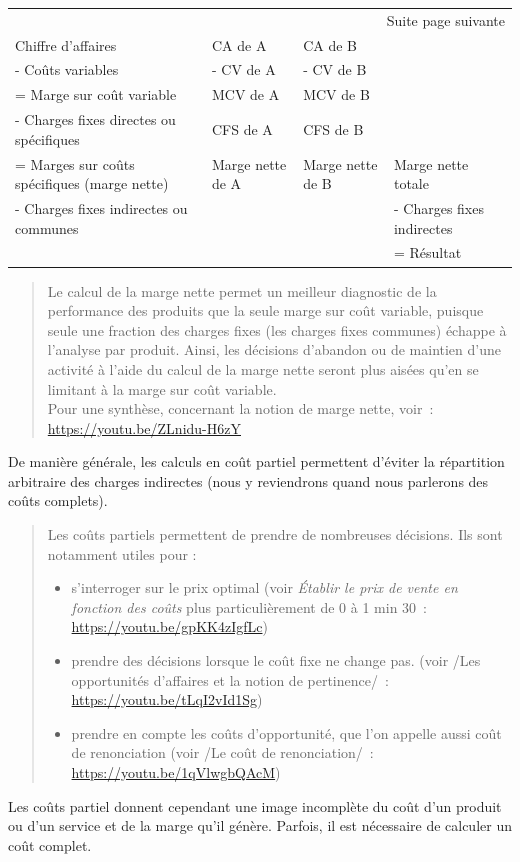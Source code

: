 \documentclass{tufte-handout}
\begin{document}
\begin{enumerate}
\begin{longtable}{llll}
\hline
\endhead
\hline\multicolumn{4}{r}{Suite page suivante} \\
\endfoot
\endlastfoot
\hline
Chiffre d'affaires & CA de A & CA de B & \\
- Coûts variables & - CV de A & - CV de B & \\
= Marge sur coût variable & MCV de A & MCV de B & \\
- Charges fixes directes ou spécifiques & CFS de A & CFS de B & \\
= Marges sur coûts spécifiques (marge nette) & Marge nette de A & Marge nette de B & Marge nette totale\\
- Charges fixes indirectes ou communes &  &  & - Charges fixes indirectes\\
 &  &  & = Résultat\\
\end{longtable}

\begin{quote}
Le calcul de la marge nette permet un meilleur diagnostic de la performance des produits que la seule marge sur coût variable, puisque seule une fraction des charges fixes (les charges fixes communes) échappe à l'analyse par produit. Ainsi, les décisions d'abandon ou de maintien d'une activité à l'aide du calcul de la marge nette seront plus aisées qu'en se limitant à la marge sur coût variable.\\
Pour une synthèse, concernant la notion de marge nette, voir : \url{https://youtu.be/ZLnidu-H6zY}\\
\end{quote}

De manière générale, les calculs en coût partiel permettent d'éviter la répartition arbitraire des charges indirectes (nous y reviendrons quand nous parlerons des coûts complets).\\
\begin{quote}
Les coûts partiels permettent de prendre de nombreuses décisions. Ils sont notamment utiles pour :\\
\begin{itemize}
\item s'interroger sur le prix optimal (voir \emph{Établir le prix de vente en fonction des coûts} plus particulièrement de 0 à 1 min 30 : \url{https://youtu.be/gpKK4zIgfLc})\\
\item prendre des décisions lorsque le coût fixe ne change pas. (voir /Les opportunités d'affaires et la notion de pertinence/ : \url{https://youtu.be/tLqI2vId1Sg})\\
\item prendre en compte les coûts d'opportunité, que l'on appelle aussi coût de renonciation (voir /Le coût de renonciation/ : \url{https://youtu.be/1qVlwgbQAcM})\\
\end{itemize}
\end{quote}
Les coûts partiel donnent cependant une image incomplète du coût d'un produit ou d'un service et de la marge qu'il génère. Parfois, il est nécessaire de calculer un coût complet.\\


\end{enumerate}
\end{document}
